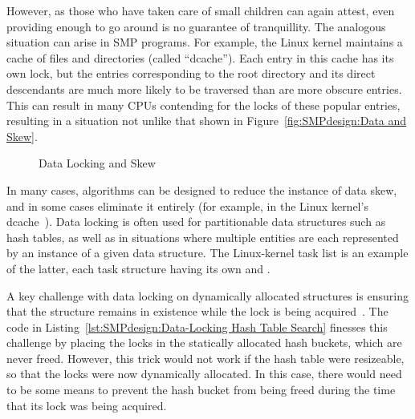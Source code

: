 However, as those who have taken care of small children can again attest,
even providing enough to go around is no guarantee of tranquillity.
The analogous situation can arise in SMP programs.
For example, the Linux kernel maintains a cache of files and directories
(called ``dcache'').
Each entry in this cache has its own lock, but the entries corresponding
to the root directory and its direct descendants are much more likely to
be traversed than are more obscure entries.
This can result in many CPUs contending for the locks of these popular
entries, resulting in a situation not unlike that
shown in Figure~\ref{fig:SMPdesign:Data and Skew}.

\begin{figure}[tbh]
\centering
{}
\caption{Data Locking and Skew}
\end{figure}

In many cases, algorithms can be designed to reduce the instance of
data skew, and in some cases eliminate it entirely
(for example, in the Linux kernel's
dcache~\cite{McKenney04a,JonathanCorbet2010dcacheRCU,NeilBrown2015PathnameLookup,NeilBrown2015RCUwalk,NeilBrown2015PathnameSymlinks}).
Data locking is often used for partitionable data structures such as
hash tables, as well as in situations where multiple entities are each
represented by an instance of a given data structure.
The Linux-kernel task list is an example of the latter, each task
structure having its own  and .

A key challenge with data locking on dynamically allocated structures
is ensuring that the structure remains in existence while the lock is
being acquired~\cite{Gamsa99}.
The code in
Listing~\ref{lst:SMPdesign:Data-Locking Hash Table Search}
finesses this challenge by placing the locks in the statically allocated
hash buckets, which are never freed.
However, this trick would not work if the hash table were resizeable,
so that the locks were now dynamically allocated.
In this case, there would need to be some means to prevent the hash
bucket from being freed during the time that its lock was being acquired.

